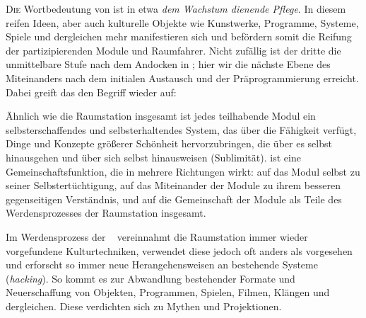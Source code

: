     
\begin{newstuff}
    \lettrine{D}{ie} Wortbedeutung von  ist in etwa \emph{dem Wachstum dienende Pflege}. In diesem  reifen Ideen, aber auch kulturelle Objekte wie Kunstwerke, Programme, Systeme, Spiele und dergleichen mehr manifestieren sich und befördern somit die Reifung der partizipierenden Module und Raumfahrer. Nicht zufällig ist der dritte  die unmittelbare Stufe nach dem Andocken in ; hier wir die nächste Ebene des Miteinanders nach dem initialen Austausch und der Präprogrammierung erreicht. Dabei greift das  den Begriff  wieder auf:


    Ähnlich wie die Raumstation insgesamt ist jedes teilhabende Modul ein selbst\-er\-schaf\-fendes und selbsterhaltendes System, das über die Fähigkeit verfügt, Dinge und Konzepte größerer Schönheit hervorzubringen, die über es selbst hinausgehen und über sich selbst hinausweisen (Sublimität).  ist eine Gemeinschaftsfunktion, die in mehrere Richtungen wirkt: auf das Modul selbst zu seiner Selbstertüchtigung, auf das Miteinander der Module zu ihrem besseren gegenseitigen Verständnis, und auf die Gemeinschaft der Module als Teile des Werdensprozesses der Raumstation insgesamt.

    Im Werdensprozess der \  vereinnahmt die Raumstation immer wieder vorgefundene Kulturtechniken, verwendet diese jedoch oft anders als vorgesehen und erforscht so immer neue Herangehensweisen an bestehende Systeme (\emph{hacking}). So kommt es zur Abwandlung bestehender Formate und Neuerschaffung von Objekten, Programmen, Spielen, Filmen,  Klängen und dergleichen. Diese verdichten sich zu Mythen und Projektionen.


        

\end{newstuff}
